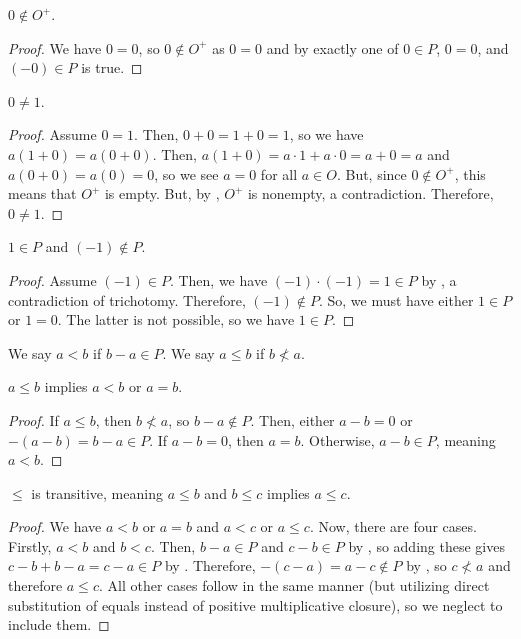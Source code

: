 \begin{lemma}\label{0-nonpos}
    $0 \notin O^+$.
\end{lemma}
\begin{proof}
    We have $0 = 0$, so $0 \notin O^+$ as $0 =0$ and by  exactly one of $0 \in P$, $0 =0$, and $(-0) \in P$ is true.
\end{proof}

\begin{theorem}\label{0-neq-1}
    $0 \neq 1$.
\end{theorem}
\begin{proof}
Assume $0 = 1$. Then, $0+0 = 1+0 = 1$, so we have $a(1+0) = a (0+0)$. Then, $a(1+0) = a \cdot 1 + a \cdot 0 = a + 0 = a$ and $a(0+0) = a(0) = 0$, so we see $a =0$ for all $a \in O$. But, since $0 \notin O^+$, this means that $O^+$ is empty. But, by  , $O^+$ is nonempty, a contradiction. Therefore, $0 \neq 1$.
\end{proof}

\begin{theorem}[$1$ is positive]\label{1-pos}
    $1 \in P$ and $(-1) \notin P$.
\end{theorem}
\begin{proof}
    Assume $(-1) \in P$. Then, we have $(-1) \cdot (-1) = 1\in P$ by , a contradiction of trichotomy. Therefore, $(-1) \notin P$. So, we must have either $1 \in P$ or $1=0$. The latter is not possible, so we have $1 \in P$.  
\end{proof}

\begin{definition}\label{def-le-and-leq}
    We say $a < b$ if $b-a \in P$. We say $a \le b$ if $b \nless a$. 
\end{definition}

\begin{theorem}\label{leq-le-or-eq}
    $a \le b$ implies $a<b$ or $a= b$.
\end{theorem}
\begin{proof}
    If $a \le b$, then $b \nless a$, so $b-a \notin P$. Then, either $a-b = 0$ or $-(a-b) = b-a \in P$. If $a-b=0$, then $a=b$. Otherwise, $a-b \in P$, meaning $a<b$. 
\end{proof}

\begin{theorem}\label{leq-transitive}
    $\le$ is transitive, meaning $a\le b$ and $b \le c$ implies $a \le c$.
\end{theorem}
\begin{proof}
We have $a<b$ or $a=b$ and $a<c$ or $a \le c$. Now, there are four cases. Firstly, $a<b$ and $b < c$. Then, $b-a \in P$ and $c-b \in P$ by , so adding these gives $c-b + b-a = c-a \in P$ by . Therefore, $-(c-a) = a-c \notin P$ by , so $c \nless a$ and therefore $a \le c$. All other cases follow in the same manner (but utilizing direct substitution of equals instead of positive multiplicative closure), so we neglect to include them.
\end{proof}


